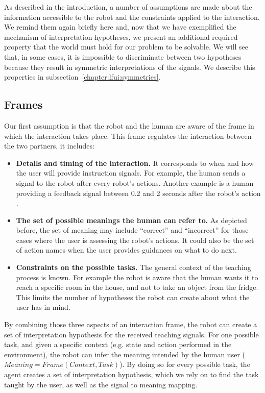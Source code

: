 As described in the introduction, a number of assumptions are made about the information accessible to the robot and the constraints applied to the interaction. We remind them again briefly here and, now that we have exemplified the mechanism of interpretation hypotheses, we present an additional required property that the world must hold for our problem to be solvable. We will see that, in some cases, it is impossible to discriminate between two hypotheses because they result in symmetric interpretations of the signals. We describe this properties in subsection~\ref{chapter:lfui:symmetries}.

\subsection{Frames}

Our first assumption is that the robot and the human are aware of the frame in which the interaction takes place. This frame regulates the interaction between the two partners, it includes:

\begin{itemize}

\item \textbf{Details and timing of the interaction.} It corresponds to when and how the user will provide instruction signals. For example, the human sends a signal to the robot after every robot's actions. Another example is a human providing a feedback signal between 0.2 and 2 seconds after the robot's action \cite{knox2009interactively}.

\item \textbf{The set of possible meanings the human can refer to.} As depicted before, the set of meaning may include ``correct'' and ``incorrect'' for those cases where the user is assessing the robot's actions. It could also be the set of action names when the user provides guidances on what to do next.

\item \textbf{Constraints on the possible tasks.} The general context of the teaching process is known. For example the robot is aware that the human wants it to reach a specific room in the house, and not to take an object from the fridge. This limits the number of hypotheses the robot can create about what the user has in mind.

\end{itemize}

By combining those three aspects of an interaction frame, the robot can create a set of interpretation hypothesis for the received teaching signals. For one possible task, and given a specific context (e.g. state and action performed in the environment), the robot can infer the meaning intended by the human user ($Meaning = Frame(Context, Task)$). By doing so for every possible task, the agent creates a set of interpretation hypothesis, which we rely on to find the task taught by the user, as well as the signal to meaning mapping.


